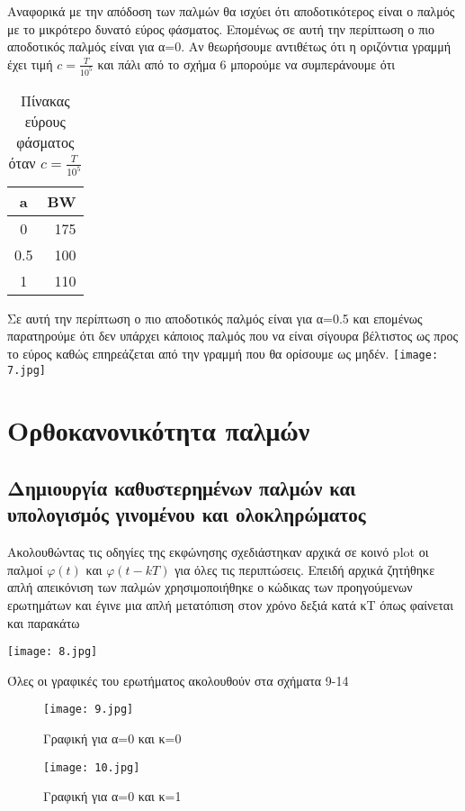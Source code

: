 \documentclass[11pt]{article}
\newcommand{\np}{\newpage}	%
\begin{document}
Αναφορικά με την απόδοση των παλμών θα ισχύει ότι αποδοτικότερος είναι ο παλμός με το μικρότερο δυνατό εύρος φάσματος. Επομένως σε αυτή την περίπτωση ο πιο αποδοτικός παλμός είναι για α=0. Αν θεωρήσουμε αντιθέτως ότι η οριζόντια γραμμή έχει τιμή $ c = \frac{T}{10^5}$ και πάλι από το σχήμα 6 μπορούμε να συμπεράνουμε ότι

\begin{table}[ht]
	\centering
	\caption{Πίνακας εύρους φάσματος όταν $ c = \frac{T}{10^5}$}
	\begin{tabular}{c|r}
		a & \foreignlanguage{english}{BW}\\
		\hline
		0 & 175\\
		0.5 & 100\\
		1 & 110\\
	\end{tabular}
\end{table}
Σε αυτή την περίπτωση ο πιο αποδοτικός παλμός είναι για α=0.5 και επομένως παρατηρούμε ότι δεν υπάρχει κάποιος παλμός που να είναι σίγουρα βέλτιστος ως προς το εύρος καθώς επηρεάζεται από την γραμμή που θα ορίσουμε ως μηδέν.
\hfill
\texttt{[image: 7.jpg]}
\np
\section{Ορθοκανονικότητα παλμών}

\subsection{Δημιουργία καθυστερημένων παλμών και υπολογισμός γινομένου και ολοκληρώματος}

Ακολουθώντας τις οδηγίες της εκφώνησης σχεδιάστηκαν αρχικά σε κοινό \foreignlanguage{english}{plot} οι παλμοί $φ(t)$ και $φ(t-kΤ)$ για όλες τις περιπτώσεις. Επειδή αρχικά ζητήθηκε απλή απεικόνιση των παλμών χρησιμοποιήθηκε ο κώδικας των προηγούμενων ερωτημάτων και έγινε μια απλή μετατόπιση στον χρόνο δεξιά κατά κΤ όπως φαίνεται και παρακάτω 

\texttt{[image: 8.jpg]}
\hfill

Όλες οι γραφικές του ερωτήματος ακολουθούν στα σχήματα 9-14


\begin{figure}[ht]
  \centering
  \begin{minipage}{0.45\textwidth}
    \texttt{[image: 9.jpg]}
    \caption{Γραφική για α=0 και κ=0}
  \end{minipage}
  \hfill
  \begin{minipage}{0.45\textwidth}
    \texttt{[image: 10.jpg]}
    \caption{Γραφική για α=0 και κ=1}
  \end{minipage}
\end{figure}
\end{document}
